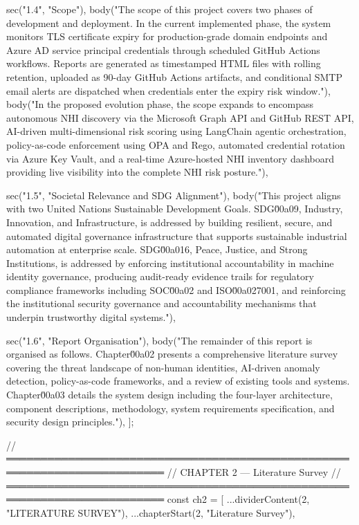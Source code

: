   sec("1.4", "Scope"),
  body("The scope of this project covers two phases of development and deployment. In the current implemented phase, the system monitors TLS certificate expiry for production-grade domain endpoints and Azure AD service principal credentials through scheduled GitHub Actions workflows. Reports are generated as timestamped HTML files with rolling retention, uploaded as 90-day GitHub Actions artifacts, and conditional SMTP email alerts are dispatched when credentials enter the expiry risk window."),
  body("In the proposed evolution phase, the scope expands to encompass autonomous NHI discovery via the Microsoft Graph API and GitHub REST API, AI-driven multi-dimensional risk scoring using LangChain agentic orchestration, policy-as-code enforcement using OPA and Rego, automated credential rotation via Azure Key Vault, and a real-time Azure-hosted NHI inventory dashboard providing live visibility into the complete NHI risk posture."),

  sec("1.5", "Societal Relevance and SDG Alignment"),
  body("This project aligns with two United Nations Sustainable Development Goals. SDG\u00a09, Industry, Innovation, and Infrastructure, is addressed by building resilient, secure, and automated digital governance infrastructure that supports sustainable industrial automation at enterprise scale. SDG\u00a016, Peace, Justice, and Strong Institutions, is addressed by enforcing institutional accountability in machine identity governance, producing audit-ready evidence trails for regulatory compliance frameworks including SOC\u00a02 and ISO\u00a027001, and reinforcing the institutional security governance and accountability mechanisms that underpin trustworthy digital systems."),

  sec("1.6", "Report Organisation"),
  body("The remainder of this report is organised as follows. Chapter\u00a02 presents a comprehensive literature survey covering the threat landscape of non-human identities, AI-driven anomaly detection, policy-as-code frameworks, and a review of existing tools and systems. Chapter\u00a03 details the system design including the four-layer architecture, component descriptions, methodology, system requirements specification, and security design principles."),
];

// ═════════════════════════════════════════════════════════════════════════
//  CHAPTER 2 — Literature Survey
// ═════════════════════════════════════════════════════════════════════════
const ch2 = [
  ...dividerContent(2, "LITERATURE SURVEY"),
  ...chapterStart(2, "Literature Survey"),

